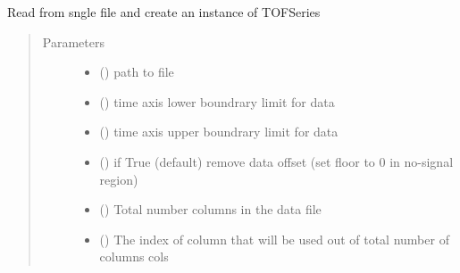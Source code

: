 \documentclass[letterpaper,10pt,english]{sphinxmanual}
\begin{document}
\begin{fulllineitems}
\label{\detokenize{scibeam.core:scibeam.core.tofseries.read_file}}
Read from sngle file and create an instance of TOFSeries
\begin{quote}\begin{description}
\item[{Parameters}] \leavevmode\begin{itemize}
\item {} 
 () \textendash{} path to file

\item {} 
 () \textendash{} time axis lower boundrary limit for data

\item {} 
 () \textendash{} time axis upper boundrary limit for data

\item {} 
 () \textendash{} if True (default) remove data offset (set floor to 0 in no-signal region)

\item {} 
 () \textendash{} Total number columns in the data file

\item {} 
 () \textendash{} The index of column that will be used out of total number of columns cols


\end{itemize}
\end{description}
\end{quote}
\end{fulllineitems}
\end{document}
